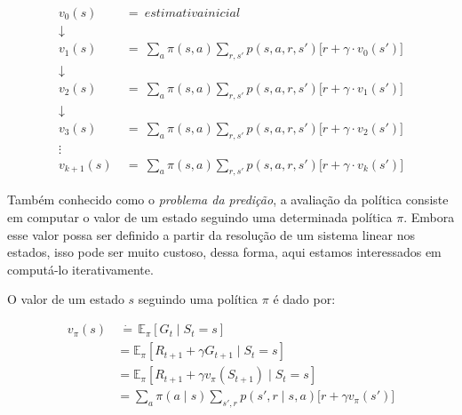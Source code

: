 \documentclass{article}
\begin{document}
            \begin{equation}
            \begin{split}
                v_0(s) & \ = \ estimativa inicial\\
                \downarrow\\
                v_1(s) & \ = \ \sum_{a} \pi(s, a) \sum_{r, s'} p(s, a, r, s') \Big[ r + \gamma \cdot v_0(s') \Big]\\
                \downarrow\\
                v_2(s) & \ = \ \sum_{a} \pi(s, a) \sum_{r, s'} p(s, a, r, s') \Big[ r + \gamma \cdot v_1(s') \Big]\\
                \downarrow\\
                v_3(s) & \ = \ \sum_{a} \pi(s, a) \sum_{r, s'} p(s, a, r, s') \Big[ r + \gamma \cdot v_2(s') \Big]\\
                \vdots\\
                v_{k+1}(s) & \ = \ \sum_{a} \pi(s, a) \sum_{r, s'} p(s, a, r, s') \Big[ r + \gamma \cdot v_k(s') \Big]
            \end{split}
            \end{equation}
    
            Também conhecido como o \textit{problema da predição}, a avaliação da política consiste em computar o valor de um estado seguindo uma determinada política $\pi$. Embora esse valor possa ser definido a partir da resolução de um sistema linear nos estados, isso pode ser muito custoso, dessa forma, aqui estamos interessados em computá-lo iterativamente.
            
            O valor de um estado $s$ seguindo uma política $\pi$ é dado por:
            
            \begin{equation}
                \begin{split}
                    v_{\pi}(s) & \ \dot{=} \, \mathbb{E}_{\pi} \left[ G_t \mid S_t = s \right] \\
                    & = \mathbb{E}_{\pi} \left[ R_{t+1} + \gamma G_{t+1} \mid S_t = s \right] \\
                    & = \mathbb{E}_{\pi} \left[ R_{t+1} + \gamma v_{\pi}(S_{t+1}) \mid S_t = s \right] \\
                    & = \sum_a \pi(a \mid s) \sum_{s',r} p(s',r \mid s,a) \Big[ r + \gamma v_{\pi}(s') \Big]
                \end{split}
            \end{equation}
                    
\end{document}
